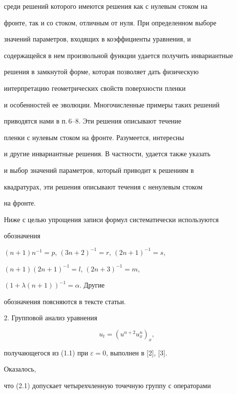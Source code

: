 среди решений которого имеются решения как с нулевым стоком на


фронте, так и со стоком, отличным от нуля. При определенном выборе


значений параметров, входящих в коэффициенты уравнения, и


содержащейся в нем произвольной функции удается получить инвариантные


решения в замкнутой форме, которая позволяет дать физическую


интерпретацию геометрических свойств поверхности пленки 


и особенностей ее эволюции. Многочисленные примеры таких решений


приводятся нами в п.\,6--8. Эти решения описывают течение


пленки с нулевым стоком на фронте. Разумеется, интересны


и другие инвариантные решения. В частности, удается также указать


и выбор значений параметров, который приводит к решениям в


квадратурах, эти решения описывают течения с ненулевым стоком


на фронте.





Ниже с целью упрощения записи формул систематически используются


обозначения\linebreak


$(n+1)n^{-1}=p$, $(3n+2)^{-1}=r$, $(2n+1)^{-1}=s$,


$(n+1)(2n+1)^{-1}=l$, $(2n+3)^{-1}=m$,


$(1+\lambda(n+1))^{-1}=\alpha$. Другие


обозначения поясняются в тексте статьи.


\medskip





2. Групповой анализ уравнения


\begin{equation}


u_t=(u^{n+2}u^n_x)_x,\tag{2.1}


\end{equation}


получающегося из (1.1) при $\varepsilon=0$, выполнен в [2], [3].


Оказалось,


что (2.1) допускает четырехчленную точечную группу с операторами


